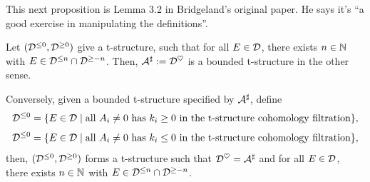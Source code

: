 \documentclass[12pt]{article}
\begin{document}
This next proposition is Lemma 3.2 in Bridgeland's original paper. He says it's ``a good exercise in manipulating the definitions''.

\begin{prop}
    Let $(\mathcal{D}^{\leq 0}, \mathcal{D}^{\geq 0})$ give a t-structure, such that for all $E\in \mathcal{D}$, there exists $n\in \mathbb{N}$ with $E\in \mathcal{D}^{\leq n} \cap \mathcal{D}^{\geq -n}$. Then, $\mathcal{A}^\sharp := \mathcal{D}^\heartsuit$ is a bounded t-structure in the other sense.

    Conversely, given a bounded t-structure specified by $\mathcal{A}^\sharp$, define
    \[\mathcal{D}^{\leq 0} = \{E\in \mathcal{D} \mid \text{all $A_{i}\neq 0$ has $k_i\geq 0$ in the t-structure cohomology filtration}\},\]
    \[\mathcal{D}^{\leq 0} = \{E\in \mathcal{D} \mid \text{all $A_{i}\neq 0$ has $k_i\leq 0$ in the t-structure cohomology filtration}\},\]
    then, $(\mathcal{D}^{\leq 0}, \mathcal{D}^{\geq 0})$ forms a t-structure such that $\mathcal{D}^\heartsuit = \mathcal{A}^\sharp$ and for all $E\in \mathcal{D}$, there exists $n\in \mathbb{N}$ with $E\in \mathcal{D}^{\leq n} \cap \mathcal{D}^{\geq -n}$.
\end{prop}
\end{document}
